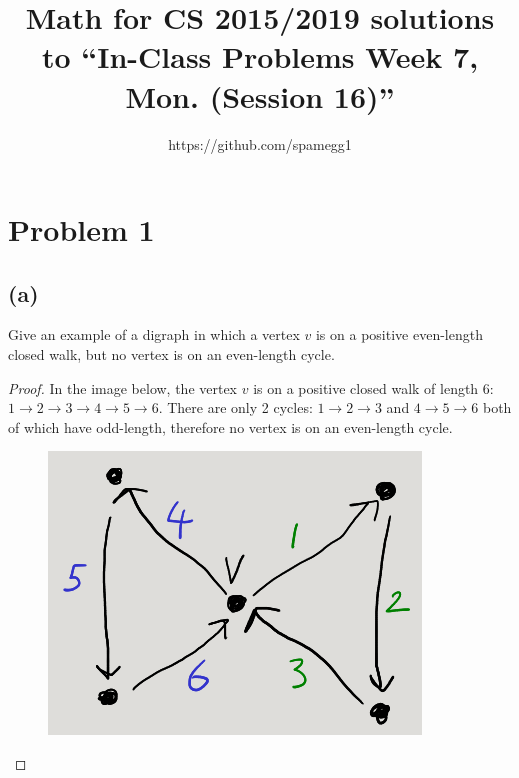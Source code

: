 \documentclass[14pt]{extarticle}
\title{Math for CS 2015/2019 solutions to ``In-Class Problems Week 7, Mon. (Session 16)''}
\author{https://github.com/spamegg1}
\begin{document}
\maketitle
\tableofcontents

\section{Problem 1}
\subsection{(a)}
Give an example of a digraph in which a vertex $v$ is on a positive even-length closed walk, but no vertex is on an even-length cycle.
\begin{proof}
In the image below, the vertex $v$ is on a positive closed walk of length 6: $1 \to 2 \to 3 \to 4 \to 5 \to 6$. There are only 2 cycles: $1 \to 2 \to 3$ and $4 \to 5 \to 6$ both of which have odd-length, therefore no vertex is on an even-length cycle.

\begin{figure}[ht!]
\centering
\includegraphics[scale=0.5]{even-length.png}
\end{figure}
\end{proof}
\end{document}
